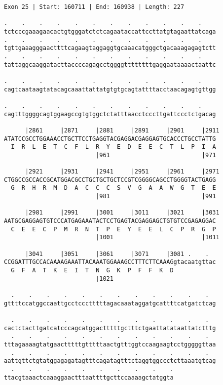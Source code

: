 \documentclass{article}
\begin{document}
\begin{Verbatim}
Exon 25 | Start: 160711 | End: 160938 | Length: 227

.    .    .    .    .    .    .    .    .    .    .    .    
tctcccgaaagaacactgtgggatctctcagaataccattccttatgtagaattatcaga
.    .    .    .    .    .    .    .    .    .    .    .    
tgttgaaagggaacttttcagaagtaggaggtgcaaacatgggctgacaaagagagtctt
.    .    .    .    .    .    .    .    .    .    .    .    
tattaggcaaggatacttaccccagagcctggggttttttttgaggaataaaactaattc
  
.    .    .    .    .    .    .    .    .    .    .    .    
cagtcaataagtatacagcaaattattatgtgtgcagtattttacctaacagagtgttgg
  
.    .    .    .    .    .    .    .    .    .    .    .    
cagtttggggcagtggaagccgtgtggctctatttaacctcccttgattccctctgacag
  
      |2861     |2871     |2881     |2891     |2901     |2911
ATATCCGCCTGGAAACCTGCTTCCTGAGGTACGAGGACGAGGAGTGCACCCTGCCTATTG
  I  R  L  E  T  C  F  L  R  Y  E  D  E  E  C  T  L  P  I  A
                          |961                          |971
  
      |2921     |2931     |2941     |2951     |2961     |2971
CTGGCCGCCACCGCATGGACGCCTGCTGCTGCTCCGTCGGGGCAGCCTGGGGTACTGAGG
  G  R  H  R  M  D  A  C  C  C  S  V  G  A  A  W  G  T  E  E
                          |981                          |991
  
      |2981     |2991     |3001     |3011     |3021     |3031
AATGCGAGGAGTGTCCCATGAGAAATACTCCTGAGTACGAGGAGCTGTGTCCGAGAGGAC
  C  E  E  C  P  M  R  N  T  P  E  Y  E  E  L  C  P  R  G  P
                          |1001                         |1011
  
      |3041     |3051     |3061     |3071     |3081 .    .  
CCGGATTTGCCACAAAAGAAATTACAAATGGAAAGCCTTTCTTCAAAGgtacaatgttac
  G  F  A  T  K  E  I  T  N  G  K  P  F  F  K  D            
                          |1021                             
  
  .    .    .    .    .    .    .    .    .    .    .    .  
gttttccatggccaattgcctccctttttagacaaataggatgcattttcatgatctcag
  
  .    .    .    .    .    .    .    .    .    .    .    .  
cactctacttgatcatcccagcatggactttttgctttctgaattatataattatctttg 
  .    .    .    .    .    .    .    .    .    .    .    .  
tttagaaaagtatgaactttttgtttttaactgtttggtccaagaagtcctgggggttaa
  .    .    .    .    .    .    .    .    .    .    .    .  
aattgttctgtatggagagatagtttcagatagtttctaggtggccctcttaaatgtcag
  .    .    .    .    .    .    .    .    .    .
ttacgtaaactcaaaggaactttaattttgcttccaaaagctatggta
\end{Verbatim}
\end{document}
